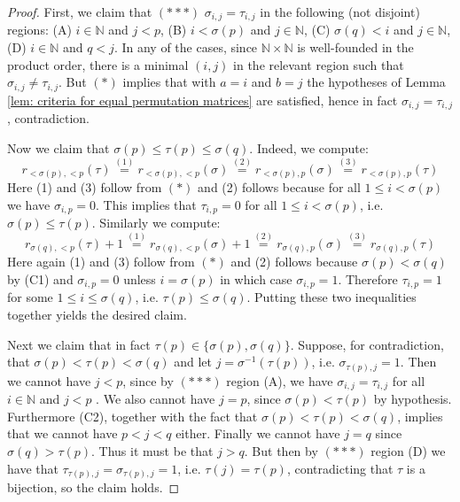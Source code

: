 \documentclass[10pt,a4paper]{amsart}
\newcommand{\nn}{\ensuremath{\mathbb{N}}}
\begin{document}
\begin{proof}
First, we claim that $(\ast \ast \ast)$ $\sigma_{i , j} = \tau_{i , j}$ in the following (not disjoint) regions: (A) $i \in \nn$ and $j < p$, (B) $i < \sigma
(p)$ and $j \in \nn$, (C) $\sigma(q) < i$ and $j \in \nn$, (D) $i \in \nn$ and $q < j$. In any of the cases, since $\nn \times \nn$ is well-founded in the product order, there is a minimal $(i , j)$ in the relevant region such that $\sigma_{i , j} \neq \tau_{i , j}$. But $(\ast)$ implies that with $a = i$ and $b  = j$ the hypotheses of Lemma \ref{lem: criteria for equal permutation matrices} are satisfied, hence in fact $\sigma_{i , j} = \tau_{i , j}$, contradiction. 

Now we claim that $\sigma(p) \leq \tau(p) \leq \sigma(q)$. Indeed, we compute:  
\begin{equation*}
    r_{<\sigma(p) , < p}(\tau) \overset{(1)}{=} r_{<\sigma(p) , < p}(\sigma) \overset{(2)}{=} r_{<\sigma(p) , p}(\sigma) \overset{(3)}{=} r_{<\sigma(p) , p}(\tau)
\end{equation*}
Here (1) and (3) follow from $(\ast)$ and (2) follows because for all $1 \leq i < \sigma(p)$ we have $\sigma_{i , p} = 0$.  This implies that $\tau_{i , p} = 0$ for all $1 \leq i < \sigma(p)$, i.e. $\sigma(p) \leq \tau(p)$. Similarly we compute: 
\begin{equation*}
    r_{\sigma(q) , <p}(\tau) + 1 \overset{(1)}{=} r_{\sigma(q) , <p}(\sigma) + 1 \overset{(2)}{=} r_{\sigma(q) , p}(\sigma) \overset{(3)}{=} r_{\sigma(q) , p}(\tau)
\end{equation*}
Here again (1) and (3) follow from $(\ast)$ and (2) follows because $\sigma(p) < \sigma(q)$ by (C1) and $\sigma_{i , p} = 0$ unless $i = \sigma(p)$ in which case $\sigma_{i , p} = 1$. Therefore $\tau_{i , p} = 1$ for some $1 \leq i \leq \sigma(q)$, i.e. $\tau(p) \leq \sigma(q)$. Putting these two inequalities together yields the desired claim.  

Next we claim that in fact $\tau(p) \in \{ \sigma(p), \sigma(q) \}$. Suppose, for contradiction, that $\sigma(p) < \tau(p) < \sigma(q)$ and let $j = \sigma^{-1}(\tau(p))$, i.e. $\sigma_{\tau(p) , j} = 1$. Then we cannot have $j < p$, since by $(\ast \ast \ast)$ region (A), we have $\sigma_{i , j} = \tau_{i , j}$ for all $i \in \nn$ and $j < p$ . We also cannot have $j = p$, since $\sigma(p) < \tau(p)$ by hypothesis. Furthermore (C2), together with the fact that $\sigma(p) < \tau(p) < \sigma(q)$, implies that we cannot have $p < j < q$ either. Finally we cannot have $j = q$ since $\sigma(q) > \tau(p)$. Thus it must be that $j > q$. But then by $(\ast \ast \ast)$ region (D) we have that $\tau_{\tau(p) , j} = \sigma_{\tau(p) , j} = 1$, i.e. $\tau(j) = \tau(p)$, contradicting that $\tau$ is a bijection, so the claim holds.


\end{proof}
\end{document}
